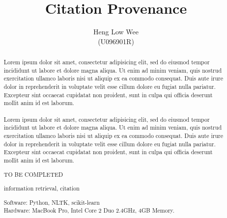 \documentclass[hyp]{socreport}
\begin{document}
\title{Citation Provenance}
\author{Heng Low Wee \\ (U096901R)}
\maketitle
\begin{abstract}
\paragraph{}
Lorem ipsum dolor sit amet, consectetur adipisicing elit, sed do eiusmod tempor incididunt ut labore et dolore magna aliqua. Ut enim ad minim veniam, quis nostrud exercitation ullamco laboris nisi ut aliquip ex ea commodo consequat. Duis aute irure dolor in reprehenderit in voluptate velit esse cillum dolore eu fugiat nulla pariatur. Excepteur sint occaecat cupidatat non proident, sunt in culpa qui officia deserunt mollit anim id est laborum.

\paragraph{}
Lorem ipsum dolor sit amet, consectetur adipisicing elit, sed do eiusmod tempor incididunt ut labore et dolore magna aliqua. Ut enim ad minim veniam, quis nostrud exercitation ullamco laboris nisi ut aliquip ex ea commodo consequat. Duis aute irure dolor in reprehenderit in voluptate velit esse cillum dolore eu fugiat nulla pariatur. Excepteur sint occaecat cupidatat non proident, sunt in culpa qui officia deserunt mollit anim id est laborum.

\begin{descriptors}
	\item TO BE COMPLETED
\end{descriptors}
\begin{keywords}
	information retrieval, citation
\end{keywords}
\begin{implement}
\begin{flushleft}
\hspace{5 mm}Software: Python, NLTK, scikit-learn\\
\hspace{5 mm}Hardware: MacBook Pro, Intel Core 2 Duo 2.4GHz, 4GB Memory.
\end{flushleft}
\end{implement}
\end{abstract}
\end{document}
